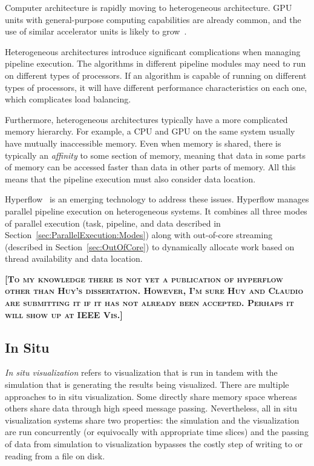 \documentclass[journal,onecolumn,12pt,letterpaper,twoside]{IEEEtran}
\newcommand*{\lcite}[1]{~\cite{#1}}
\newcommand*{\keyterm}[1]{\emph{#1}}
\newcommand{\fix}[1]{{\color{red}\textbf{\textsc{[#1]}}}}
\begin{document}
Computer architecture is rapidly moving to heterogeneous architecture.  GPU
units with general-purpose computing capabilities are already common, and
the use of similar accelerator units is likely to
grow\lcite{ExascaleRoadMap,ExascaleArchitecturesReport}.

Heterogeneous architectures introduce significant complications when
managing pipeline execution.  The algorithms in different pipeline
modules may need to run on different types of processors.  If an
algorithm is capable of running on different types of processors, it will
have different performance characteristics on each one, which complicates
load balancing.

Furthermore, heterogeneous architectures typically have a more complicated
memory hierarchy.  For example, a CPU and GPU on the same system usually
have mutually inaccessible memory.  Even when memory is shared, there is
typically an \keyterm{affinity} to some section of memory, meaning that
data in some parts of memory can be accessed faster than data in other
parts of memory.  All this means that the pipeline execution must also
consider data location.

Hyperflow\lcite{VoPhD} is an emerging technology to address these issues.
Hyperflow manages parallel pipeline execution on heterogeneous systems.  It
combines all three modes of parallel execution (task, pipeline, and data
described in Section~\ref{sec:ParallelExecution:Modes}) along with
out-of-core streaming (described in Section~\ref{sec:OutOfCore}) to
dynamically allocate work based on thread availability and data location.

\fix{To my knowledge there is not yet a publication of hyperflow other than
  Huy's dissertation.  However, I'm sure Huy and Claudio are submitting it
  if it has not already been accepted.  Perhaps it will show up at IEEE
  Vis.}

\subsection{In Situ}
\label{sec:InSitu}

\keyterm{In situ visualization} refers to visualization that is run in
tandem with the simulation that is generating the results being
visualized.  There are multiple approaches to in situ visualization.  Some
directly share memory space whereas others share data through high speed
message passing.  Nevertheless, all in situ visualization systems share two
properties: the simulation and the visualization are run concurrently (or
equivocally with appropriate time slices) and the passing of data from
simulation to visualization bypasses the costly step of writing to or
reading from a file on disk.
\end{document}
